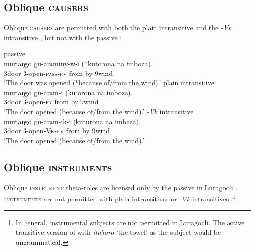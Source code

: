 \documentclass[output=paper]{langsci/langscibook}
\begin{document}
\subsection{Oblique \textsc{causers}}

Oblique \textsc{causers} are permitted with both the plain intransitive  and the \textit{-Vk} intransitive , but not with the passive :

\ea\label{ex:gluckman:8} 
  \ea\label{ex:gluckman:8a} 
  {{passive}}\\
  \gll muriaŋgo gu-araminy-w-i  (*kutorona na imboza).\\
      3door 3-open-\textsc{pass}-\textsc{fv}      from   by 9wind\\
  \glt ‘The door was opened (*because of/from the wind).’
  \ex\label{ex:gluckman:8b} 
  { {plain intransitive}}\\
  \gll muriaŋgo gu-aram-i (kutorona na imboza).\\
      3door 3-open-\textsc{fv}    from by 9wind\\
  \glt ‘The door opened (because of/from the wind).’
  \ex\label{ex:gluckman:8c} 
  { {\textit{-Vk}} {intransitive}}\\
  \gll muriaŋgo gu-aram-ik-i    (kuturona na imboza).\\
      3door       3-open\textit{-}\textsc{Vk}-\textsc{fv}   from       by 9wind\\
  \glt ‘The door opened (because of/from the wind).’
  \z
\z

\subsection{Oblique \textsc{instruments}}

Oblique \textsc{instrument} theta-roles are licensed only by the passive in Luragooli . \textsc{Instruments} are not permitted with plain intransitives  or \textit{-Vk} intransitives .\footnote{In general, instrumental subjects are not permitted in Luragooli. The active transitive version of  with \textit{itahoro} ‘the towel’ as the subject would be ungrammatical.}
\end{document}

